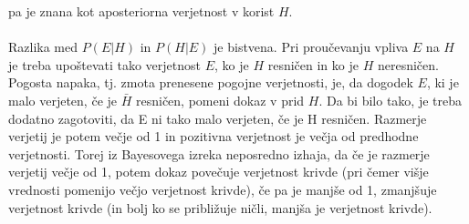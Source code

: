 \documentclass[fin1, tisk]{fmfdelo}
\theoremstyle{definition}
\theoremstyle{trditev}
\theoremstyle{izrek}
\begin{document}
pa je znana kot aposteriorna verjetnost v korist $H$.\\\\
Razlika med $P(E \lvert H)$ in $P(H \lvert E)$ je bistvena. Pri proučevanju vpliva
$E$ na $H$ je treba upoštevati tako verjetnost $E$, ko je $H$ resničen in ko je $H$ neresničen. Pogosta napaka, tj. zmota prenesene pogojne
verjetnosti, je, da dogodek $E$, ki je malo verjeten, če je $\bar{H}$ resničen, pomeni dokaz v prid $H$. Da bi bilo tako, je treba dodatno
zagotoviti, da E ni tako malo verjeten, če je H resničen. Razmerje verjetij je potem večje od 1 in pozitivna verjetnost je večja od
predhodne verjetnosti. Torej iz Bayesovega izreka neposredno izhaja, da če je razmerje verjetij večje od 1, potem dokaz povečuje
verjetnost krivde (pri čemer višje vrednosti pomenijo večjo verjetnost krivde), če pa je manjše od 1, zmanjšuje verjetnost krivde
(in bolj ko se približuje ničli, manjša je verjetnost krivde).

\end{document}

